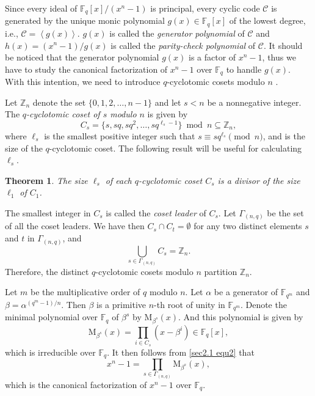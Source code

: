 \documentclass[sn-mathphys-num]{sn-jnl}%
\theoremstyle{thmstyleone}%
\newtheorem{theorem}{Theorem}%
\theoremstyle{thmstyletwo}%
\theoremstyle{thmstylethree}%
\begin{document}
Since every ideal of $\mathbb{F}_q[x]/(x^n-1)$ is principal, every cyclic code $\mathcal{C}$ is generated by the unique monic polynomial $g(x)\in\mathbb{F}_q[x]$ of the lowest degree, i.e., $\mathcal{C}=\left<g(x)\right>$. $g(x)$ is called the \textit{generator polynomial} of $\mathcal{C}$ and $h(x)=(x^n-1)/g(x)$ is called the \textit{parity-check polynomial} of $\mathcal{C}$. It should be noticed that the generator polynomial $g(x)$ is a factor of $x^n-1$, thus we have to study the canonical factorization of $x^n-1$ over $\mathbb{F}_q$ to handle $g(x)$. With this intention, we need to introduce $q$-cyclotomic cosets modulo $n$ \cite{Ding2014CodesDifferenceSetsa}.

Let $\mathbb{Z}_n$ denote the set $\{0,1,2,\dots,n-1\}$ and let $s<n$ be a nonnegative integer. The \textit{$q$-cyclotomic coset of $s$ modulo $n$} is given by 
\begin{equation}\label{sec2.1 equ1}
	C_s=\{s,sq,sq^2,\ldots,sq^{\ell_s-1}\}\bmod n\subseteq\mathbb{Z}_n,
\end{equation}
where $\ell_s$ is the smallest positive integer such that $s \equiv sq^{\ell_s} \pmod n$, and is the size of the $q$-cyclotomic coset. The following result will be useful for calculating $\ell_s$.
\begin{theorem}\cite[Theorem 4.1.4]{Huffman2003FundamentalErrorCodes}
	\label{sec2.1 thm1}
	The size $\ell_s$ of each $q$-cyclotomic coset $C_s$ is a divisor of the size $\ell_1$ of $C_1$.
\end{theorem}
The smallest integer in $C_s$ is called the \textit{coset leader} of $C_s$. Let $\Gamma_{(n,q)}$ be the set of all the coset leaders. We have then $C_s \cap C_t = \emptyset$ for any two distinct elements $s$ and $t$ in $\Gamma_{(n,q)}$, and
\begin{equation}\label{sec2.1 equ2}
	\bigcup_{s\in\Gamma_{(n,q)}}C_s=\mathbb{Z}_n.
\end{equation}
Therefore, the distinct $q$-cyclotomic cosets modulo $n$ partition $\mathbb{Z}_n$. 

Let $m$ be the multiplicative order of $q$ modulo $n$. Let $\alpha$ be a generator of $\mathbb{F}_{q^m}$ and $\beta=\alpha^{(q^m-1)/n}$. Then $\beta$ is a primitive $n$-th root of unity in $\mathbb{F}_{q^m}$. Denote the minimal	polynomial over $\mathbb{F}_q$ of $\beta^s$ by $\mathrm{M}_{\beta^s}(x)$. And this polynomial is given by
\begin{equation}\label{sec2.1 equ3}
	\mathrm{M}_{\beta^s}(x)=\prod\limits_{i\in C_s}(x-\beta^i)\in\mathbb{F}_q[x],
\end{equation}
which is irreducible over $\mathbb{F}_q$. It then follows from \cref{sec2.1 equ2} that
\begin{equation*}
	x^n-1=\prod_{s\in\Gamma_{(n,q)}}\mathrm{M}_{\beta^s}(x),
\end{equation*}
which is the canonical factorization of $x^n - 1$ over $\mathbb{F}_q$.
\end{document}
